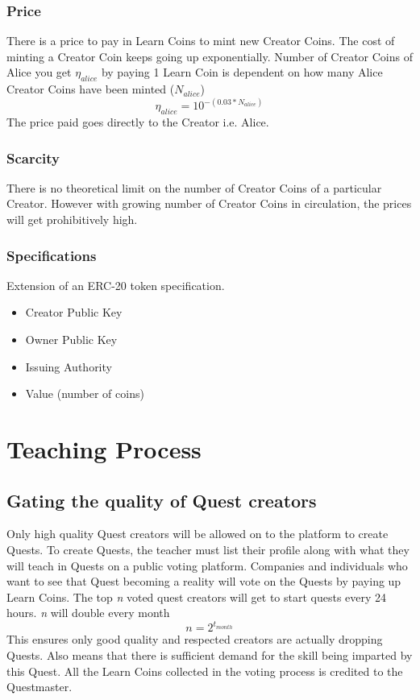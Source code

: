 \documentclass{article}
\begin{document}
      \subsubsection{Price}
        There is a price to pay in Learn Coins to mint new Creator Coins. The cost of minting a Creator Coin keeps going up exponentially.
        Number of Creator Coins of Alice you get \(\eta_{alice}\) by paying 1 Learn Coin is dependent on how many Alice Creator Coins have been minted (\(N_{alice}\)) 
        \[
          \eta_{alice} = 10^{-(0.03 * N_{alice})}
        \]
        The price paid goes directly to the Creator i.e. Alice.
      \subsubsection{Scarcity}
        There is no theoretical limit on the number of Creator Coins of a particular Creator. However with growing number of Creator Coins in circulation, the prices will get prohibitively high.
      \subsubsection{Specifications}
        Extension of an ERC-20 token specification.
        \begin{itemize}
          \item Creator Public Key
          \item Owner Public Key
          \item Issuing Authority
          \item Value (number of coins)
        \end{itemize}

      
  \section{Teaching Process}
    \subsection{Gating the quality of Quest creators}
      Only high quality Quest creators will be allowed on to the platform to create Quests. To create Quests, the teacher must list their profile along with what they will teach in Quests on a public voting platform.
      Companies and individuals who want to see that Quest becoming a reality will vote on the Quests by paying up Learn Coins. The top \textit{n} voted quest creators will get to start quests every 24 hours. \textit{n} will double every month
      \[
        n = 2^{t_{month}}
      \]
      This ensures only good quality and respected creators are actually dropping Quests. Also means that there is sufficient demand for the skill being imparted by this Quest.
      All the Learn Coins collected in the voting process is credited to the Questmaster.
\end{document}
